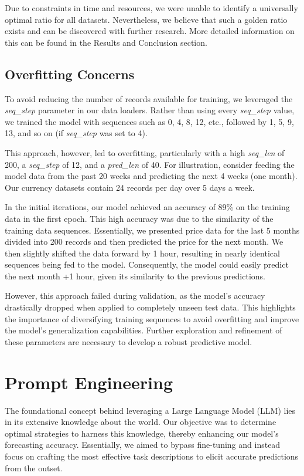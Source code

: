 Due to constraints in time and resources, we were unable to identify a universally optimal ratio for all datasets. Nevertheless, we believe that such a golden ratio exists and can be discovered with further research. More detailed information on this can be found in the Results and Conclusion section.

\subsection{Overfitting Concerns}
To avoid reducing the number of records available for training, we leveraged the \textit{seq\_step} parameter in our data loaders. Rather than using every \textit{seq\_step} value, we trained the model with sequences such as 0, 4, 8, 12, etc., followed by 1, 5, 9, 13, and so on (if \textit{seq\_step} was set to 4).

This approach, however, led to overfitting, particularly with a high \textit{seq\_len} of 200, a \textit{seq\_step} of 12, and a \textit{pred\_len} of 40. For illustration, consider feeding the model data from the past 20 weeks and predicting the next 4 weeks (one month). Our currency datasets contain 24 records per day over 5 days a week.

In the initial iterations, our model achieved an accuracy of 89\% on the training data in the first epoch. This high accuracy was due to the similarity of the training data sequences. Essentially, we presented price data for the last 5 months divided into 200 records and then predicted the price for the next month. We then slightly shifted the data forward by 1 hour, resulting in nearly identical sequences being fed to the model. Consequently, the model could easily predict the next month +1 hour, given its similarity to the previous predictions.

However, this approach failed during validation, as the model's accuracy drastically dropped when applied to completely unseen test data. This highlights the importance of diversifying training sequences to avoid overfitting and improve the model's generalization capabilities. Further exploration and refinement of these parameters are necessary to develop a robust predictive model.

\section{Prompt Engineering}

The foundational concept behind leveraging a Large Language Model (LLM) lies in its extensive knowledge about the world. Our objective was to determine optimal strategies to harness this knowledge, thereby enhancing our model's forecasting accuracy. Essentially, we aimed to bypass fine-tuning and instead focus on crafting the most effective task descriptions to elicit accurate predictions from the outset.

